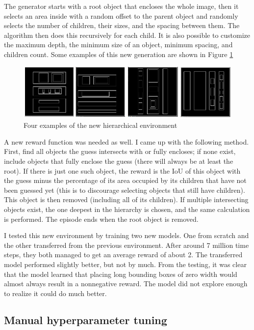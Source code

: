 \documentclass[
  digital,     %
  oneside,     %
  nosansbold,  %
  nocolorbold, %
  lof,         %
  lot,         %
]{fithesis4}
\begin{document}
The generator starts with a root object that encloses the whole image, then it selects an area inside with a random offset to the parent object and randomly selects the number of children, their sizes, and the spacing between them. The algorithm then does this recursively for each child. It is also possible to customize the maximum depth, the minimum size of an object, minimum spacing, and children count. Some examples of this new generation are shown in Figure \ref{fig:env7}

\begin{figure}
    \centering
    \includegraphics[width=1\linewidth]{env_examples/env7.png}
    \caption{Four examples of the new hierarchical environment}
    \label{fig:env7}
\end{figure}

A new reward function was needed as well. I came up with the following method. First, find all objects the guess intersects with or fully encloses; if none exist, include objects that fully enclose the guess (there will always be at least the root). If there is just one such object, the reward is the IoU of this object with the guess minus the percentage of its area occupied by its children that have not been guessed yet (this is to discourage selecting objects that still have children). This object is then removed (including all of its children). If multiple intersecting objects exist, the one deepest in the hierarchy is chosen, and the same calculation is performed. The episode ends when the root object is removed.

I tested this new environment by training two new models. One from scratch and the other transferred from the previous environment. After around 7 million time steps, they both managed to get an average reward of about 2. The transferred model performed slightly better, but not by much. From the testing, it was clear that the model learned that placing long bounding boxes of zero width would almost always result in a nonnegative reward. The model did not explore enough to realize it could do much better.

\subsection{Manual hyperparameter tuning}
\end{document}
